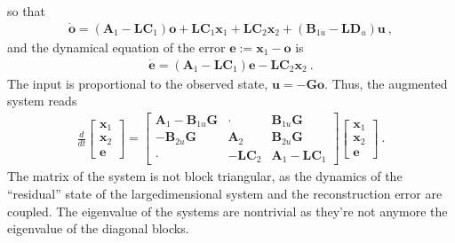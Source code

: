 \documentclass[letterpaper,10pt,english]{jupyterBook}
\begin{document}
\sphinxAtStartPar
so that
\begin{equation*}
\begin{split}\dot{\mathbf{o}} = \left( \mathbf{A}_1 - \mathbf{L} \mathbf{C}_1 \right) \mathbf{o} + \mathbf{L} \mathbf{C}_1 \mathbf{x}_1 + \mathbf{L} \mathbf{C}_2 \mathbf{x}_2 + \left( \mathbf{B}_{1u} - \mathbf{L} \mathbf{D}_{u} \right) \mathbf{u} \ ,\end{split}
\end{equation*}
\sphinxAtStartPar
and the dynamical equation of the error \(\mathbf{e} := \mathbf{x}_1 - \mathbf{o}\) is
\begin{equation*}
\begin{split}\dot{\mathbf{e}} = \left( \mathbf{A}_1 - \mathbf{L} \mathbf{C}_1 \right) \mathbf{e} - \mathbf{L} \mathbf{C}_2 \mathbf{x}_2  \ .\end{split}
\end{equation*}
\sphinxAtStartPar
The input is proportional to the observed state, \(\mathbf{u} = - \mathbf{G} \mathbf{o}\). Thus, the augmented system reads
\begin{equation*}
\begin{split}
\frac{d}{dt} \begin{bmatrix} \mathbf{x}_1 \\ \mathbf{x}_2 \\ \mathbf{e} \end{bmatrix} =
\begin{bmatrix}
\mathbf{A}_1 - \mathbf{B}_{1u} \mathbf{G} & \cdot & \mathbf{B}_{1u} \mathbf{G} \\
 - \mathbf{B}_{2u} \mathbf{G}  & \mathbf{A}_2 & \mathbf{B}_{2u} \mathbf{G} \\
 \cdot & - \mathbf{L} \mathbf{C}_2 & \mathbf{A}_1 - \mathbf{L} \mathbf{C}_1
\end{bmatrix}
\begin{bmatrix} \mathbf{x}_1 \\ \mathbf{x}_2 \\ \mathbf{e} \end{bmatrix} \ .
\end{split}
\end{equation*}
\sphinxAtStartPar
The matrix of the system is not block triangular, as the dynamics of the “residual” state of the large\sphinxhyphen{}dimensional system and the reconstruction error are coupled. The eigenvalue of the systems are non\sphinxhyphen{}trivial as they’re not anymore the eigenvalue of the diagonal blocks.

\sphinxstepscope
\end{document}
